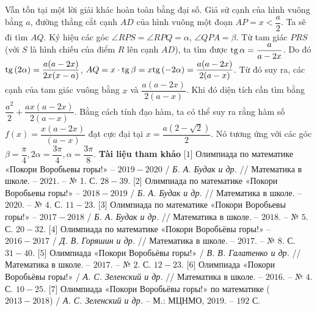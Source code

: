 \begin{multicols}{2}
	Vẫn tồn tại một lời giải khác hoàn toàn bằng đại số. Giả sử cạnh của hình vuông bằng $a$, đường thẳng cắt cạnh $AD$ của hình vuông một đoạn  $AP = x < \dfrac{a}{2}$. Ta sẽ đi tìm $AQ$. Ký hiệu các góc $\angle RPS = \angle RPQ = \alpha $, $\angle QPA = \beta$. Từ tam giác $PRS$ (với $S$ là hình chiếu của điểm $R$ lên cạnh $AD$), ta tìm được ${\rm{tg}}\,\alpha  = \dfrac{a}{{a - 2x}}$. Do đó  ${\rm{tg}}\,(2\alpha ) = \dfrac{{a(a - 2x)}}{{2x(x - a)}}$,  $AQ = x \cdot {\rm{tg}}\,\beta  = x{\rm{tg}}\,( - 2\alpha ) = \dfrac{{a(a - 2x)}}{{2(a - x)}}$.
	\vskip 0.1cm
	Từ đó suy ra, các cạnh của tam giác vuông bằng $x$ và  $\dfrac{{a(a - 2x)}}{{2(a - x)}}$. Khi đó diện tích cần tìm bằng $\dfrac{{{a^2}}}{2} + \dfrac{{ax(a - 2x)}}{{2(a - x)}}$. Bằng cách tính đạo hàm, ta có thể suy ra rằng hàm số $f(x) = \dfrac{{x(a - 2x)}}{{(a - x)}}$  đạt cực đại tại  $x = \dfrac{{a(2 - \sqrt 2 )}}{2}$. Nó tương ứng với các góc  $\beta = \dfrac{\pi}{4}, 2\alpha = \dfrac{3\pi}{4}, \alpha = \dfrac{3\pi}{8}$.
	\vskip 0.1cm
	\textbf{\color{cackithi}Tài liệu tham khảo}
	\vskip 0.1cm
	[$1$] Олимпиада по математике «Покори Воробьевы горы!» -- $2019-2020$ / \textit{Б. А. Будак и др.} // Математика в школе. -- $2021$. -- № 1. С. $28 - 39$.
	\vskip 0.1cm
	[$2$] Олимпиада по математике «Покори Воробьевы горы!» -- $2018-2019$ / \textit{Б. А. Будак и др.} // Математика в школе. -- $2020$. -- № $4$. С. $11 - 23$.
	\vskip 0.1cm
	[$3$] Олимпиада по математике «Покори Воробьевы горы!» -- $2017-2018$ / \textit{Б. А. Будак и др.} // Математика в школе. -- $2018$. -- № $5$. С. $20 - 32$.
	\vskip 0.1cm
	[$4$] Олимпиада по математике «Покори Воробьёвы горы!» -- $2016-2017$ / \textit{Д. В. Горяшин и др.} // Математика в школе. -- $2017$. -- № 8. $С$. $31- 40$.
	\vskip 0.1cm
	[$5$] Олимпиада «Покори Воробьёвы горы!» / \textit{В. В. Галатенко и др.} // Математика в школе. -- $2017$. -- № $2$. С. $12 - 23$.
	\vskip 0.1cm
	[$6$] Олимпиада «Покори Воробьёвы горы!» / \textit{А. С. Зеленский и др.} // Математика в школе. -- $2016$. -- № $4$. С. $10 - 25$.
	\vskip 0.1cm
	[$7$] Олимпиада «Покори Воробьёвы горы!» по математике ($2013 - 2018$) / \textit{А. С. Зеленский и др.} -- М.: МЦНМО, $2019$. -- $192$ С. 
\end{multicols}

